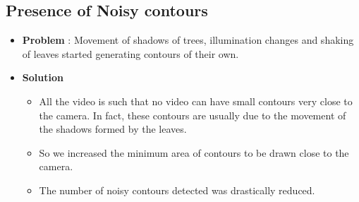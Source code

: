 \documentclass[12pt,a4paper]{report}
\begin{document}
\subsection*{Presence of Noisy contours}
\begin{itemize}
\item \textbf{Problem} : Movement of shadows of trees, illumination changes and shaking of leaves started generating contours of their own.
\item \textbf{Solution}
    \begin{itemize}
    \item All the video is such that no video can have small contours very close to the camera. In fact, these contours are usually due to the movement of the shadows formed by the leaves.
    \item So we increased the minimum area of contours to be drawn close to the camera.
    \item The number of noisy contours detected was drastically reduced.
    \end{itemize}
\end{itemize}
\end{document}
